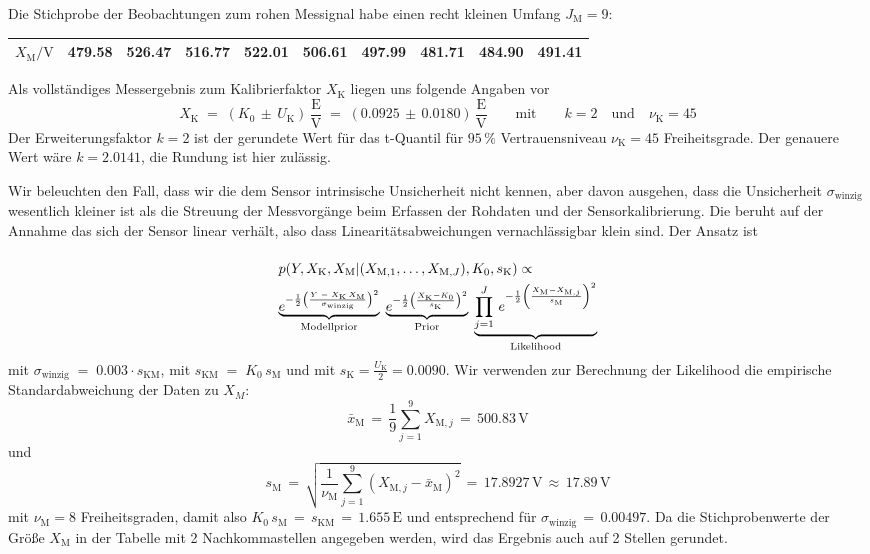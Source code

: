 Die Stichprobe der Beobachtungen zum rohen Messignal habe einen recht kleinen
Umfang $J_\mathrm{M} = 9$:

\begin{tabular}{l|c|c|c|c|c|c|c|c|c}
\hline
$X_\mathrm{M} / \mathrm{V}$ &  479.58 &  526.47 &  516.77 &  522.01 &  506.61 &  497.99 &  481.71 &  484.90 &  491.41\\
\hline
\end{tabular}

Als vollständiges Messergebnis zum Kalibrierfaktor $X_\mathrm{K}$ liegen uns folgende Angaben vor
$$
X_\mathrm{K} \; = \; (K_0 \, \pm \, U_\mathrm{K}) \, \frac{\mathrm{E}}{\mathrm{V}}
 \; = \; (0.0925 \, \pm \, 0.0180) \, \frac{\mathrm{E}}{\mathrm{V}}
 \qquad \mathrm{mit} \qquad k = 2 \quad \mathrm{und} \quad \nu_\mathrm{K} = 45
$$
Der Erweiterungsfaktor $k = 2$ ist der gerundete Wert für das 
t-Quantil für $95 \, \%$ Vertrauensniveau $\nu_\mathrm{K} = 45$ Freiheitsgrade.
Der genauere Wert wäre $k = 2.0141$, die Rundung ist hier zulässig.

Wir beleuchten den Fall, dass wir die dem Sensor intrinsische Unsicherheit nicht kennen, aber
davon ausgehen, dass die Unsicherheit $\sigma_\mathrm{winzig}$ 
wesentlich kleiner ist als die Streuung der Messvorgänge beim
Erfassen der Rohdaten und der Sensorkalibrierung. Die beruht auf der Annahme
das sich der Sensor linear verhält, also dass Linearitätsabweichungen vernachlässigbar
klein sind. Der Ansatz ist
\begin{equation}
\arraycolsep=2.0pt\def\arraystretch{2.0}
\begin{array}{l}
p(Y, X_\mathrm{K}, X_\mathrm{M} | (X_{\mathrm{M},1}, \dots, X_{\mathrm{M},J}), K_0, s_\mathrm{K}) \propto \\
\underbrace{e^{-\frac{1}{2} \left(\frac{ Y \; - \; X_\mathrm{K} \, X_\mathrm{M}}{\sigma_\mathrm{winzig}} \right)^2}}_{\text{Modellprior}}
\;  \underbrace{e^{-\frac{1}{2} \left(\frac{X_\mathrm{K} - K_0}{s_\mathrm{K}} \right)^2}}_{\text{Prior}}
 \; \underbrace{\prod\limits_{j=1}^J  \,
e^{-\frac{1}{2} \left(\frac{ X_\mathrm{M} - X_{\mathrm{M},j} }{s_\mathrm{M}} \right)^2}}_{\text{Likelihood}}
\end{array}
\label{PosteriorSensor}
\end{equation}
mit $\sigma_\mathrm{winzig} \; = \; 0.003 \cdot s_\mathrm{KM}$, mit $s_\mathrm{KM}  \; = \; K_0 \,
s_\mathrm{M}$ und mit $s_\mathrm{K} = \frac{U_\mathrm{K}}{2} = 0.0090$.
Wir verwenden zur Berechnung der Likelihood die empirische Standardabweichung der Daten zu $X_M$:
$$
\bar x_\mathrm{M} \, = \, \frac{1}{9} \sum_{j=1}^9 X_{\mathrm{M},j} \, = \, 500.83 \, \mathrm{V}
$$
und
$$
s_\mathrm{M} \, = \, \sqrt{ \frac{1}{\nu_\mathrm{M}} \sum_{j=1}^9 (X_{\mathrm{M},j} - \bar x_\mathrm{M})^2 }
 \, = \, 17.8927 \, \mathrm{V} \, \approx \,  17.89 \, \mathrm{V} 
$$
mit $\nu_\mathrm{M} = 8$ Freiheitsgraden,
damit also  
$K_0 \, s_\mathrm{M} \, = \, s_\mathrm{KM} \, = \, 1.655 \, \mathrm{E}$ und entsprechend für $\sigma_\mathrm{winzig} \, = \, 0.00497$.
Da die Stichprobenwerte
der Größe $X_\mathrm{M}$ in der Tabelle mit 2 Nachkommastellen angegeben werden, wird das Ergebnis
auch auf 2 Stellen gerundet.


